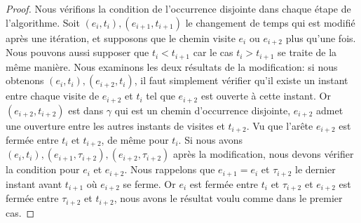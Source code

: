 \documentclass[titlepage,a4paper,12pt]{article}
\newcounter{d}
\newcounter{t}
\newcounter{p}
\newcounter{c}
\newcounter{a}
\newcounter{l}
\begin{document}
\begin{proof}
Nous vérifions la condition de l'occurrence disjointe dans chaque étape de l'algorithme. Soit $(e_i,t_i),(e_{i+1},t_{i+1})$ le changement de temps qui est modifié après une itération, et supposons que le chemin visite $e_i$ ou $e_{i+2}$ plus qu'une fois. Nous pouvons aussi supposer que $t_i< t_{i+1}$ car le cas $t_i> t_{i+1}$ se traite de la même manière. Nous examinons les deux résultats de la modification: si nous obtenons $(e_i,t_i),(e_{i+2},t_i)$, il faut simplement vérifier qu'il existe un instant entre chaque visite de $e_{i+2}$ et $t_i$ tel que $e_{i+2}$ est ouverte à cette instant. Or $(e_{i+2},t_{i+2})$ est dans $\gamma$ qui est un chemin d'occurrence disjointe, $e_{i+2}$ admet une ouverture entre les autres instants de visites et $t_{i+2}$. Vu que l'arête $e_{i+2}$ est fermée entre $t_i$ et $t_{i+2}$, de même pour $t_i$. Si nous avons $(e_i,t_i),(e_{i+1},\tau_{i+2}),(e_{i+2},\tau_{i+2})$ après la modification, nous devons vérifier la condition pour $e_i$ et $e_{i+2}$. Nous rappelons que $e_{i+1}= e_i$ et $\tau_{i+2}$ le dernier instant avant $t_{i+1}$ où $e_{i+2}$ se ferme. Or $e_i$ est fermée entre $t_i$ et $\tau_{i+2}$ et $e_{i+2}$ est fermée entre $\tau_{i+2}$ et $t_{i+2}$, nous avons le résultat voulu comme dans le premier cas. 
\end{proof}
\end{document}
